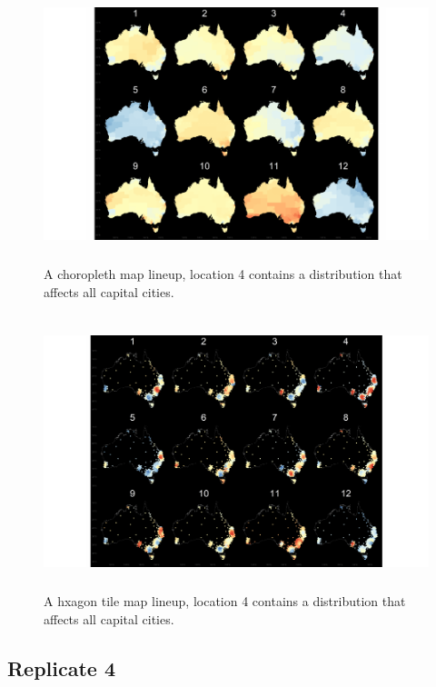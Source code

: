 \documentclass{monashthesis}
\begin{document}
\begin{figure}[H]
\centering
\includegraphics[height=8cm]{lineups/cities-geo4-1.pdf}
\caption{\label{fig:cities-geo4}A choropleth map lineup, location 4 contains a distribution that affects all capital cities.}
\end{figure}

\begin{figure}[H]
\centering
\includegraphics[height=8cm]{lineups/cities-hex4-1.pdf}
\caption{\label{fig:cities-hex4}A hxagon tile map lineup, location 4 contains a distribution that affects all capital cities.}
\end{figure}

\hypertarget{replicate-4}{%
\subsection{Replicate 4}\label{replicate-4}}
\end{document}
